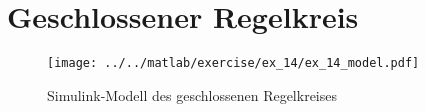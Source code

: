 \section{Geschlossener Regelkreis}

\begin{figure}[h!]
	\centering
	\texttt{[image: ../../matlab/exercise/ex\_14/ex\_14\_model.pdf]}
	\caption{Simulink-Modell des geschlossenen Regelkreises}
\end{figure}
